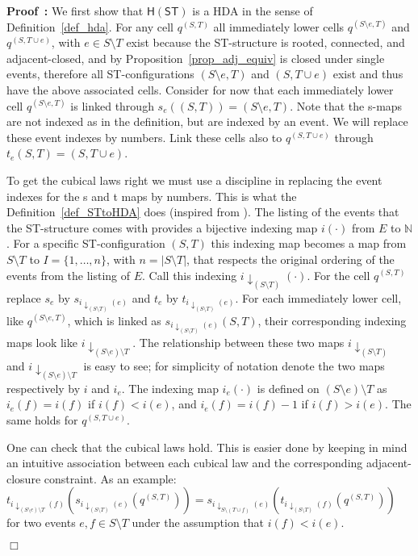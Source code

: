\documentclass[submission,copyright,creativecommons]{eptcs}
\newenvironment{proof}[1][\!\!\,]{\vspace{1ex}\noindent\textbf{Proof #1: }}{\hfill$\Box$\vspace{2ex}}
\newcommand\ST{\ensuremath{\mathsf{ST}}}
\newcommand\stintoh{\ensuremath{\mathsf{H}}}
\begin{document}
\begin{proof}
We first show that $\stintoh(\ST)$ is a HDA in the sense of Definition~\ref{def_hda}.
For any cell $q^{(S,T)}$ all immediately lower cells $q^{(S\setminus e,T)}$ and $q^{(S,T\cup e)}$, with $e\in S\setminus T$ exist because the ST-structure is rooted, connected, and adjacent-closed, and by Proposition~\ref{prop_adj_equiv} is closed under single events, therefore all ST-configurations $(S\setminus e,T)$ and $(S,T\cup e)$ exist and thus have the above associated cells. 
Consider for now that each immediately lower cell $q^{(S\setminus e,T)}$ is linked through $s_{e}((S,T))=(S\setminus e,T)$. Note that the s-maps are not indexed as in the definition, but are indexed by an event. We will replace these event indexes by numbers. Link these cells also to $q^{(S,T\cup e)}$ through $t_{e}(S,T)=(S,T\cup e)$. 

To get the cubical laws right we must use a discipline in replacing the event indexes for the s and t maps by numbers. This is what the Definition~\ref{def_STtoHDA} does (inspired from \cite{Glabbeek06HDA}). 
The listing of the events that the ST-structure comes with provides a bijective indexing map $i(\cdot)$ from $E$ to $\mathbb{N}$. For a specific ST-configuration $(S,T)$ this indexing map becomes a map from $S\setminus T$ to $I=\{1,\dots,n\}$, with $n=|S\setminus T|$, that respects the original ordering of the events from the listing of $E$. Call this indexing $i\downarrow_{(S\setminus T)}(\cdot)$.
For the cell $q^{(S,T)}$ replace $s_{e}$ by $s_{i\downarrow_{(S\setminus T)}(e)}$ and $t_{e}$ by $t_{i\downarrow_{(S\setminus T)}(e)}$. For each immediately lower cell, like $q^{(S\setminus e,T)}$, which is linked as $s_{i\downarrow_{(S\setminus T)}(e)}(S,T)$, their corresponding indexing maps look like $i\downarrow_{(S\setminus e)\setminus T}$.
The relationship between these two maps $i\downarrow_{(S\setminus T)}$ and $i\downarrow_{(S\setminus e)\setminus T}$ is easy to see; for simplicity of notation denote the two maps respectively by $i$ and $i_{e}$. The indexing map $i_{e}(\cdot)$ is defined on $(S\setminus e)\setminus T$ as $i_{e}(f)=i(f)$ if $i(f)< i(e)$, and $i_{e}(f)=i(f)-1$ if $i(f) > i(e)$.  The same holds for $q^{(S,T\cup e)}$.

One can check that the cubical laws hold. This is easier done by keeping in mind an intuitive association between each cubical law and the corresponding adjacent-closure constraint.
As an example: $t_{i\downarrow_{(S\setminus e)\setminus T}(f)}(s_{i\downarrow_{(S\setminus T)}(e)}(q^{(S,T)}))=s_{i\downarrow_{S\setminus(T\cup f)}(e)}(t_{i\downarrow_{(S\setminus T)}(f)}(q^{(S,T)}))$ for two events $e,f\in S\setminus T$ under the assumption that $i(f)<i(e)$.


\end{proof}
\end{document}
